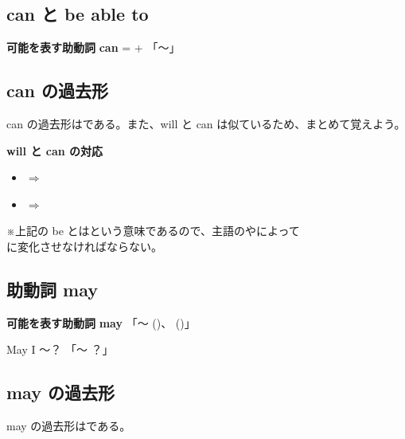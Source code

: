 \subsection{can と be able to}
\begin{definitionbox}{\textbf{可能を表す助動詞}}
    \textbf{can} =    + 
    \qquad 「〜」
\end{definitionbox}

\subsection{can の過去形}
    can の過去形はである。また、will と can は似ているため、まとめて覚えよう。

    \begin{techniquebox}{\textbf{will と can の対応}}
        \begin{itemize}
            \item {}%
                $\Longrightarrow$ 
            \item {}%
                $\Longrightarrow$ 
        \end{itemize}
    \end{techniquebox}
    \vspace{0.5em}

    ※上記の be とはという意味であるので、主語のやによって\\
    \qquad {}に変化させなければならない。

\subsection{助動詞 may}

\begin{definitionbox}{\textbf{可能を表す助動詞}}
    \textbf{may} \qquad 「〜  ()、\quad
     ()」
\end{definitionbox}
\vspace{0.5em}

    May I ～？ 「～  ？」

\subsection{may の過去形}
    may の過去形はである。
\vspace{1em}

